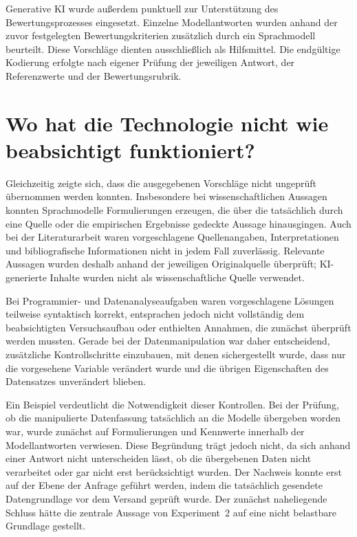 Generative KI wurde außerdem punktuell zur Unterstützung des Bewertungsprozesses eingesetzt. Einzelne Modellantworten wurden anhand der zuvor festgelegten Bewertungskriterien zusätzlich durch ein Sprachmodell beurteilt. Diese Vorschläge dienten ausschließlich als Hilfsmittel. Die endgültige Kodierung erfolgte nach eigener Prüfung der jeweiligen Antwort, der Referenzwerte und der Bewertungsrubrik.

\section{Wo hat die Technologie nicht wie beabsichtigt funktioniert?}

Gleichzeitig zeigte sich, dass die ausgegebenen Vorschläge nicht ungeprüft übernommen werden konnten. Insbesondere bei wissenschaftlichen Aussagen konnten Sprachmodelle Formulierungen erzeugen, die über die tatsächlich durch eine Quelle oder die empirischen Ergebnisse gedeckte Aussage hinausgingen. Auch bei der Literaturarbeit waren vorgeschlagene Quellenangaben, Interpretationen und bibliografische Informationen nicht in jedem Fall zuverlässig. Relevante Aussagen wurden deshalb anhand der jeweiligen Originalquelle überprüft; KI-generierte Inhalte wurden nicht als wissenschaftliche Quelle verwendet.

Bei Programmier- und Datenanalyseaufgaben waren vorgeschlagene Lösungen teilweise syntaktisch korrekt, entsprachen jedoch nicht vollständig dem beabsichtigten Versuchsaufbau oder enthielten Annahmen, die zunächst überprüft werden mussten. Gerade bei der Datenmanipulation war daher entscheidend, zusätzliche Kontrollschritte einzubauen, mit denen sichergestellt wurde, dass nur die vorgesehene Variable verändert wurde und die übrigen Eigenschaften des Datensatzes unverändert blieben.

Ein Beispiel verdeutlicht die Notwendigkeit dieser Kontrollen. Bei der Prüfung, ob die manipulierte Datenfassung tatsächlich an die Modelle übergeben worden war, wurde zunächst auf Formulierungen und Kennwerte innerhalb der Modellantworten verwiesen. Diese Begründung trägt jedoch nicht, da sich anhand einer Antwort nicht unterscheiden lässt, ob die übergebenen Daten nicht verarbeitet oder gar nicht erst berücksichtigt wurden. Der Nachweis konnte erst auf der Ebene der Anfrage geführt werden, indem die tatsächlich gesendete Datengrundlage vor dem Versand geprüft wurde. Der zunächst naheliegende Schluss hätte die zentrale Aussage von Experiment~2 auf eine nicht belastbare Grundlage gestellt.

